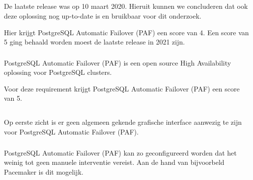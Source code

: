 \subsection{}
\label{subsec:Should have}



\subsubsection{}
\label{subsubsec:Actieve ondersteuning in 2020-2021}

De laatste release was op 10 maart 2020. Hieruit kunnen we concluderen dat ook deze oplossing nog up-to-date is en bruikbaar voor dit onderzoek. 

Hier krijgt PostgreSQL Automatic Failover (PAF) een score van 4. Een score van 5 ging behaald worden moest de laatste release in 2021 zijn.

\subsubsection{}
\label{subsubsec:Open source}

PostgreSQL Automatic Failover (PAF) is een open source High Availability oplossing voor PostgreSQL clusters.

Voor deze requirement krijgt PostgreSQL Automatic Failover (PAF) een score van 5.

\subsection{}
\label{subsec:Could have}

\subsubsection{}
\label{subsubsec:Grafische interface}

Op eerste zicht is er geen algemeen gekende grafische interface aanwezig te zijn voor PostgreSQL Automatic Failover (PAF).

\subsubsection{}
\label{subsubsec:Beperkte manuele interventie}

PostgreSQL Automatic Failover (PAF) kan zo geconfigureerd worden dat het weinig tot geen manuele interventie vereist. Aan de hand van bijvoorbeld Pacemaker is dit mogelijk.

